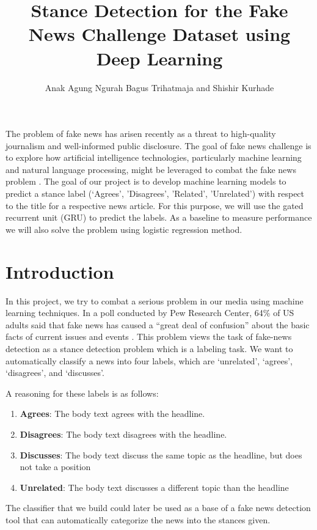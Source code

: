 \documentclass[12pt]{article}
\title{Stance Detection for the Fake News Challenge Dataset using Deep Learning}
\author{Anak Agung Ngurah Bagus Trihatmaja and Shishir Kurhade}
\date{}
\begin{document}
\maketitle

\abstract
The problem of fake news has arisen recently as a threat to high-quality 
journalism and well-informed public disclosure. The goal of fake news 
challenge is to explore how artificial intelligence technologies, particularly
machine learning and natural language processing, might be leveraged to combat 
the fake news problem \cite{fake_news_challenge}. The goal of our project is to develop machine learning 
models to predict a stance label (‘Agrees’, ’Disagrees’, ’Related’, ’Unrelated’) 
with respect to the title for a respective news article. For this purpose, we 
will use the gated recurrent unit (GRU) to predict the labels. As a baseline to 
measure performance we will also solve the problem using logistic regression method.


\section{Introduction}
In this project, we try to combat a serious problem in our media using machine 
learning techniques. In a poll conducted by Pew Research Center, 64\% of US 
adults said that fake news has caused a “great deal of confusion” about the 
basic facts of current issues and events \cite{barthel_mitchell_holcomb_2016}. 
This problem views the task of fake-news detection as a stance detection problem 
which is a labeling task. We want to automatically classify a news into four labels, 
which are ‘unrelated’, ‘agrees’, ‘disagrees’, and ‘discusses’.  

A reasoning for these labels is as follows:
\begin{enumerate}
  \item \textbf{Agrees}: The body text agrees with the headline.
  \item \textbf{Disagrees}: The body text disagrees with the headline.
  \item \textbf{Discusses}: The body text discuss the same topic as the headline, 
    but does not take a position
  \item \textbf{Unrelated}: The body text discusses a different topic than the headline
\end{enumerate}

The classifier that we build could later be used as a base of a 
fake news detection tool that can automatically categorize the news into the 
stances given.
\end{document}
